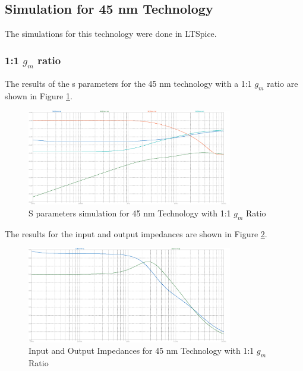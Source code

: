 \subsection{Simulation for 45 nm Technology}

The simulations for this technology were done in LTSpice.
\subsubsection{1:1 $g_m$ ratio}

The results of the s parameters for the 45 nm technology with a 1:1 $g_m$ ratio are shown in Figure \ref{fig:SParam45nm1to1}. 
\begin{figure}[H]
    \centering
    \includegraphics[width=0.8\textwidth]{Images/SParam_45_1To1.png}
    \caption{S parameters simulation for 45 nm Technology with 1:1 $g_m$ Ratio}
    \label{fig:SParam45nm1to1}
\end{figure}

The results for the input and output impedances are shown in Figure \ref{fig:ZParam45nm1to1}.

\begin{figure}[H]
    \centering
    \includegraphics[width=0.8\textwidth]{Images/Imp_45_1To1.png}
    \caption{Input and Output Impedances for 45 nm Technology with 1:1 $g_m$ Ratio}
    \label{fig:ZParam45nm1to1}
\end{figure}

